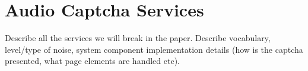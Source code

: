 \section{Audio Captcha Services}
\label{sec:services}

Describe all the services we will break in the paper. Describe vocabulary, level/type of noise,
system component implementation details (how is the captcha presented, what page elements are handled etc).
